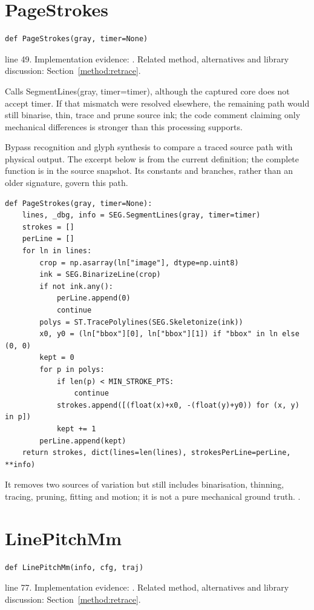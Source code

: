 \section{PageStrokes}\label{fn:retrace:PageStrokes}
\begin{lstlisting}[style=sig]
def PageStrokes(gray, timer=None)
\end{lstlisting}
 line 49. Implementation evidence: \cite{code2026}. Related method, alternatives and library discussion: Section~\ref{method:retrace}.


Calls SegmentLines(gray, timer=timer), although the captured core does not accept timer. If that mismatch were resolved elsewhere, the remaining path would still binarise, thin, trace and prune source ink; the code comment claiming only mechanical differences is stronger than this processing supports.


Bypass recognition and glyph synthesis to compare a traced source path with physical output. The excerpt below is from the current definition; the complete function is in the source snapshot. Its constants and branches, rather than an older signature, govern this path.


\begin{lstlisting}[style=plain]
def PageStrokes(gray, timer=None):
    lines, _dbg, info = SEG.SegmentLines(gray, timer=timer)
    strokes = []
    perLine = []
    for ln in lines:
        crop = np.asarray(ln["image"], dtype=np.uint8)
        ink = SEG.BinarizeLine(crop)
        if not ink.any():
            perLine.append(0)
            continue
        polys = ST.TracePolylines(SEG.Skeletonize(ink))
        x0, y0 = (ln["bbox"][0], ln["bbox"][1]) if "bbox" in ln else (0, 0)
        kept = 0
        for p in polys:
            if len(p) < MIN_STROKE_PTS:
                continue
            strokes.append([(float(x)+x0, -(float(y)+y0)) for (x, y) in p])
            kept += 1
        perLine.append(kept)
    return strokes, dict(lines=len(lines), strokesPerLine=perLine, **info)
\end{lstlisting}
It removes two sources of variation but still includes binarisation, thinning, tracing, pruning, fitting and motion; it is not a pure mechanical ground truth. \cite{code2026,zhangsuen1984,douglaspeucker1973}.


\section{LinePitchMm}\label{fn:retrace:LinePitchMm}
\begin{lstlisting}[style=sig]
def LinePitchMm(info, cfg, traj)
\end{lstlisting}
 line 77. Implementation evidence: \cite{code2026}. Related method, alternatives and library discussion: Section~\ref{method:retrace}.


